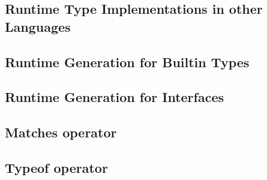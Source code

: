 \subsection{Runtime Type Implementations in other Languages}
\label{chap:runtime-other-languages}




\subsection{Runtime Generation for Builtin Types}

\subsection{Runtime Generation for Interfaces}

\subsection{Matches operator}

\subsection{Typeof operator}
